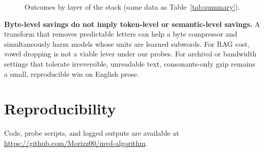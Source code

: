 \documentclass{article}
\begin{document}
\begin{figure}[ht]
	\centering
	\caption{Outcomes by layer of the stack (same data as Table~\ref{tab:summary}).}
	\label{fig:summary-diagram}
\end{figure}

\textbf{Byte-level savings do not imply token-level or semantic-level savings.} A transform that removes predictable letters can help a byte compressor and simultaneously harm models whose units are learned subwords. For RAG cost, vowel dropping is not a viable lever under our probes. For archival or bandwidth settings that tolerate irreversible, unreadable text, consonants-only gzip remains a small, reproducible win on English prose.

\section*{Reproducibility}

\noindent Code, probe scripts, and logged outputs are available at
\url{https://github.com/Morizz00/mvd-algorithm}.
\end{document}
